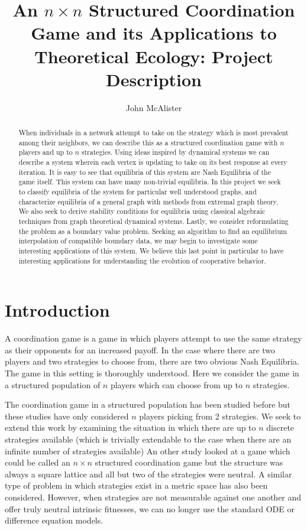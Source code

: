 \documentclass[]{article}
\title{An $n \times n$ Structured Coordination Game and its Applications to Theoretical Ecology: Project Description}
\author{John McAlister}
\begin{document}
\maketitle

\begin{abstract}
	When individuals in a network attempt to take on the strategy which is most prevalent among their neighbors, we can describe this as a structured coordination game with $n$ players and up to $n$ strategies. Using ideas inspired by dynamical systems we can describe a system wherein each vertex is updating to take on its best response at every iteration. It is easy to see that equilibria of this system are Nash Equilibria of the game itself. This system can have many non-trivial equilibria. In this project we seek to classify equilibria of the system for particular well understood graphs, and characterize equilibria of a general graph with methods from extremal graph theory. We also seek to derive stability conditions for equilibria using classical algebraic techniques from graph theoretical dynamical systems. Lastly, we consider reformulating the problem as a boundary value problem. Seeking an algorithm to find an equilibrium interpolation of compatible boundary data, we may begin to investigate some interesting applications of this system. We believe this last point in particular to have interesting applications for understanding the evolution of cooperative behavior.    
\end{abstract}

\section{Introduction}
A coordination game is a game in which players attempt to use the same strategy as their opponents for an increased payoff. In the case where there are two players and two strategies to choose from, there are two obvious Nash Equilibria. The game in this setting is thoroughly understood. Here we consider the game in a structured population of $n$ players which can choose from up to $n$ strategies. 

The coordination game in a structured population has been studied before \cite{Buskens2016, Tomassini2010} but these studies have only considered $n$ players picking from 2 strategies. We seek to extend this work by examining the situation in which there are up to $n$ discrete strategies available (which is trivially extendable to the case when there are an infinite number of strategies available)
An other study looked at a game which could be called an $n\times n$ structured coordination game\cite{Szabo2016} but the structure was always a square lattice and all but two of the strategies were neutral.
A similar type of problem in which strategies exist in a metric space has also been considered. %
However, when strategies are not measurable against one another and offer truly neutral intrinsic fitnesses, we can no longer use the standard ODE or difference equation models.
\end{document}
